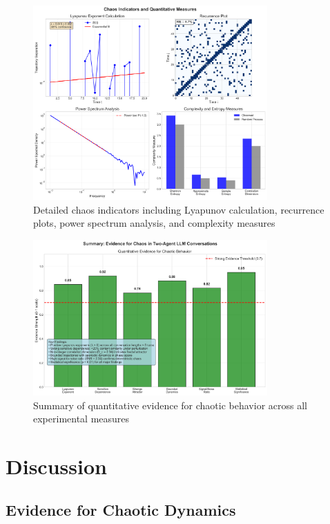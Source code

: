 \documentclass[11pt,a4paper]{article}
\begin{document}
\begin{figure}[ht]
\centering
\includegraphics[width=0.8\textwidth]{final_visualizations/chaos_indicators.png}
\caption{Detailed chaos indicators including Lyapunov calculation, recurrence plots, power spectrum analysis, and complexity measures}
\label{fig:chaos_indicators}
\end{figure}

\begin{figure}[ht]
\centering
\includegraphics[width=0.8\textwidth]{final_visualizations/summary_evidence.png}
\caption{Summary of quantitative evidence for chaotic behavior across all experimental measures}
\label{fig:summary}
\end{figure}

\section{Discussion}

\subsection{Evidence for Chaotic Dynamics}
\end{document}
